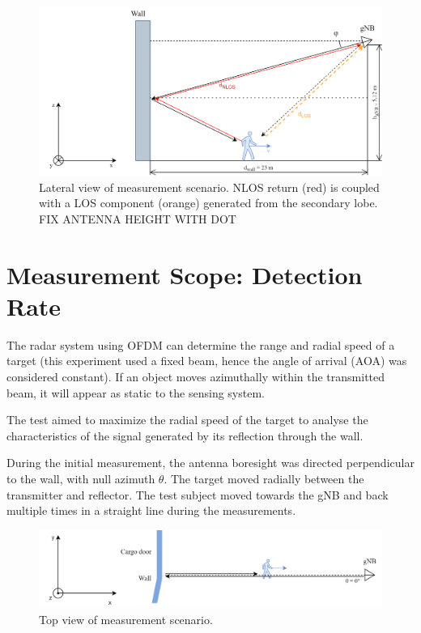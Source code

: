 \begin{figure}[H]
	\centering
	\includegraphics[width=1\textwidth]{Images/Test1/base-lateral_view_los_geometry}
	\caption{\small Lateral view of measurement scenario. NLOS return (red) is coupled with a LOS component (orange) generated from the secondary lobe.
	\alert{FIX ANTENNA HEIGHT WITH DOT}}
	\label{fig:Test1_base-lateral_view}
\end{figure}

\section{Measurement Scope: Detection Rate}

The radar system using OFDM can determine the range and radial speed of a target (this experiment used a fixed beam, hence the angle of arrival (AOA) was considered constant). If an object moves azimuthally within the transmitted beam, it will appear as static to the sensing system.

The test aimed to maximize the radial speed of the target to analyse the characteristics of the signal generated by its reflection through the wall.

During the initial measurement, the antenna boresight was directed perpendicular to the wall, with null azimuth $\theta$.
The target moved radially between the transmitter and reflector. The test subject moved towards the gNB and back multiple times in a straight line during the measurements.

\begin{figure}[H]
	\centering
	\includegraphics[width=1\textwidth]{Images/Test1/base-top_view}
	\caption{\small Top view of measurement scenario.}
	\label{fig:Test1_base-top_view}
\end{figure}


